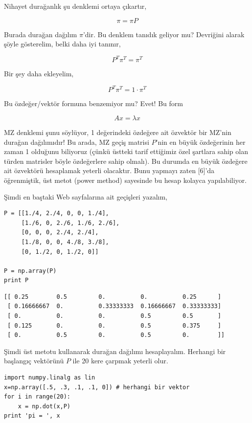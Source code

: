 \documentclass[12pt,fleqn]{article}\usepackage{../../common}
\begin{document}
Nihayet durağanlık şu denklemi ortaya çıkartır,

$$ \pi = \pi P $$

Burada durağan dağılım $\pi$'dir. Bu denklem tanıdık geliyor mu?  Devriğini
alarak şöyle gösterelim, belki daha iyi tanınır, 

$$ P^T\pi^T = \pi^T $$

Bir şey daha ekleyelim, 

$$ P^T\pi^T = 1 \cdot \pi^T $$

Bu özdeğer/vektör formuna benzemiyor mu? Evet! Bu form 

$$ Ax = \lambda x $$

MZ denklemi şunu söylüyor, 1 değerindeki özdeğere ait özvektör bir MZ'nin
durağan dağılımıdır! Bu arada, MZ geçiş matrisi $P$'nin en büyük
özdeğerinin her zaman 1 olduğunu biliyoruz (çünkü üstteki tarif ettiğimiz
özel şartlara sahip olan türden matrisler böyle özdeğerlere sahip
olmalı). Bu durumda en büyük özdeğere ait özvektörü hesaplamak yeterli
olacaktır. Bunu yapmayı zaten [6]'da öğrenmiştik, üst metot (power method)
sayesinde bu hesap kolayca yapılabiliyor.

Şimdi en baştaki Web sayfalarına ait geçişleri yazalım,

\begin{verbatim}
P = [[1./4, 2./4, 0, 0, 1./4],
     [1./6, 0, 2./6, 1./6, 2./6],
     [0, 0, 0, 2./4, 2./4],
     [1./8, 0, 0, 4./8, 3./8],
     [0, 1./2, 0, 1./2, 0]]

P = np.array(P)
print P
\end{verbatim}

\begin{verbatim}
[[ 0.25        0.5         0.          0.          0.25      ]
 [ 0.16666667  0.          0.33333333  0.16666667  0.33333333]
 [ 0.          0.          0.          0.5         0.5       ]
 [ 0.125       0.          0.          0.5         0.375     ]
 [ 0.          0.5         0.          0.5         0.        ]]
\end{verbatim}

Şimdi üst metotu kullanarak durağan dağılımı hesaplayalım. Herhangi bir
başlangıç vektörünü $P$ ile 20 kere  çarpmak yeterli olur.

\begin{verbatim}
import numpy.linalg as lin
x=np.array([.5, .3, .1, .1, 0]) # herhangi bir vektor
for i in range(20): 
    x = np.dot(x,P)
print 'pi = ', x
\end{verbatim}
\end{document}

